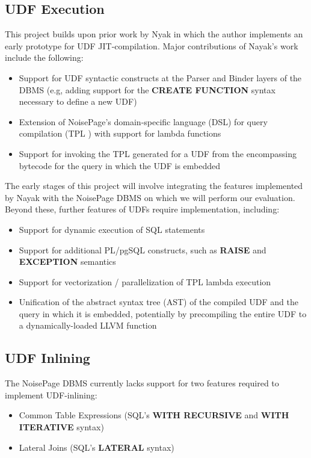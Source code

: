 \documentclass{vldb}
\newcommand{\dbCode}[1]{{\sffamily\small \textbf{#1}}\xspace}
\begin{document}
\subsection{UDF Execution}

This project builds upon prior work by Nyak \cite{tanuj} in which the author implements an early prototype for UDF JIT-compilation. Major contributions of Nayak's work include the following:

\begin{itemize}
    \item Support for UDF syntactic constructs at the Parser and Binder layers of the DBMS (e.g, adding support for the \dbCode{CREATE FUNCTION} syntax necessary to define a new UDF)
    \item Extension of NoisePage's domain-specific language (DSL) for query compilation (TPL \cite{pcq}) with support for lambda functions
    \item Support for invoking the TPL generated for a UDF from the encompassing bytecode for the query in which the UDF is embedded
\end{itemize}

The early stages of this project will involve integrating the features implemented by Nayak with the NoisePage DBMS on which we will perform our evaluation. Beyond these, further features of UDFs require implementation, including:

\begin{itemize}
    \item Support for dynamic execution of SQL statements
    \item Support for additional PL/pgSQL constructs, such as \dbCode{RAISE} and \dbCode{EXCEPTION} semantics
    \item Support for vectorization / parallelization of TPL lambda execution
    \item Unification of the abstract syntax tree (AST) of the compiled UDF and the query in which it is embedded, potentially by precompiling the entire UDF to a dynamically-loaded LLVM function
\end{itemize}

\subsection{UDF Inlining}

The NoisePage DBMS currently lacks support for two features required to implement UDF-inlining:

\begin{itemize}
    \item Common Table Expressions (SQL's \dbCode{WITH RECURSIVE} and \dbCode{WITH ITERATIVE} syntax)
    \item Lateral Joins (SQL's \dbCode{LATERAL} syntax)
\end{itemize}
\end{document}
